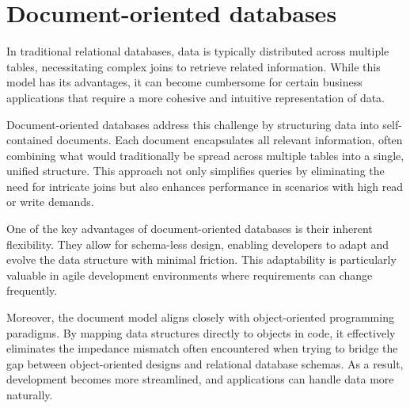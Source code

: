\section{Document-oriented databases}

In traditional relational databases, data is typically distributed across multiple tables, necessitating complex joins to retrieve related information.
While this model has its advantages, it can become cumbersome for certain business applications that require a more cohesive and intuitive representation of data.

Document-oriented databases address this challenge by structuring data into self-contained documents. 
Each document encapsulates all relevant information, often combining what would traditionally be spread across multiple tables into a single, unified structure. 
This approach not only simplifies queries by eliminating the need for intricate joins but also enhances performance in scenarios with high read or write demands.

One of the key advantages of document-oriented databases is their inherent flexibility. 
They allow for schema-less design, enabling developers to adapt and evolve the data structure with minimal friction. 
This adaptability is particularly valuable in agile development environments where requirements can change frequently.

Moreover, the document model aligns closely with object-oriented programming paradigms. 
By mapping data structures directly to objects in code, it effectively eliminates the impedance mismatch often encountered when trying to bridge the gap between object-oriented designs and relational database schemas. 
As a result, development becomes more streamlined, and applications can handle data more naturally.

